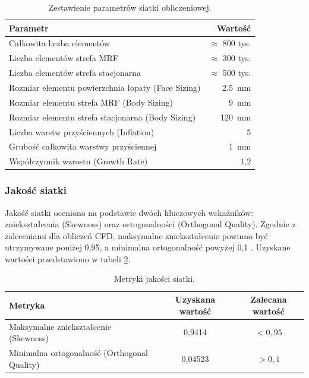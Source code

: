 \documentclass[12pt,a4paper,twoside]{article}
\begin{document}
	\begin{table}[H]
		\centering
		\caption{Zestawienie parametrów siatki obliczeniowej.}
		\label{tab:mesh_params_cfd}
		\begin{tabular}{@{}l r@{}}
			\toprule
			\textbf{Parametr} & \textbf{Wartość} \\
			\midrule
			Całkowita liczba elementów & $\approx$ 800 tys. \\
			Liczba elementów strefa MRF & $\approx$ 300 tys. \\
			Liczba elementów strefa stacjonarna & $\approx$ 500 tys. \\
			Rozmiar elementu powierzchnia łopaty (Face Sizing) & \SI{2.5}{\milli\meter} \\
			Rozmiar elementu strefa MRF (Body Sizing) & \SI{9}{\milli\meter} \\
			Rozmiar elementu strefa stacjonarna (Body Sizing) & \SI{120}{\milli\meter} \\
			Liczba warstw przyściennych (Inflation) & 5 \\
			Grubość całkowita warstwy przyściennej & \SI{1}{\milli\meter} \\
			Współczynnik wzrostu (Growth Rate) & 1,2 \\
			\bottomrule
		\end{tabular}
	\end{table}
	
	\subsubsection{Jakość siatki}
	Jakość siatki oceniono na podstawie dwóch kluczowych wskaźników: zniekształcenia (Skewness) oraz ortogonalności (Orthogonal Quality). Zgodnie z zaleceniami dla obliczeń CFD, maksymalne zniekształcenie powinno być utrzymywane poniżej 0,95, a minimalna ortogonalność powyżej 0,1 \cite{ansys_mesh_quality}. Uzyskane wartości przedstawiono w tabeli \ref{tab:mesh_quality_cfd}.
	
	\begin{table}[H]
		\centering
		\caption{Metryki jakości siatki.}
		\label{tab:mesh_quality_cfd}
		\begin{tabular}{@{}p{4.8cm} c c@{}}
			\toprule
			\textbf{Metryka} & \textbf{Uzyskana wartość} & \textbf{Zalecana wartość} \\
			\midrule
			Maksymalne zniekształcenie (Skewness) & 0,9414 & $< 0{,}95$ \\
			Minimalna ortogonalność (Orthogonal Quality) & 0,04523 & $> 0{,}1$ \\
			\bottomrule
		\end{tabular}
	\end{table}
	
\end{document}
